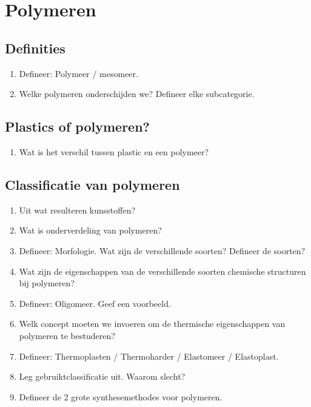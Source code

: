 \documentclass[a4paper,12pt]{article}
\begin{document}
    \maketitle

    \section{Polymeren}
    \subsection*{Definities}
    \begin{enumerate}
        \item Defineer: Polymeer / mesomeer.
        \item Welke polymeren onderschijden we? Defineer elke subcategorie.
    \end{enumerate}
    \subsection*{Plastics of polymeren?}
    \begin{enumerate}
        \item Wat is het verschil tussen plastic en een polymeer?
    \end{enumerate}
    \subsection*{Classificatie van polymeren}
    \begin{enumerate}
        \item Uit wat resulteren kunsstoffen?
        \item Wat is onderverdeling van polymeren?
        \item Defineer: Morfologie. Wat zijn de verschillende soorten? Defineer de soorten?
        \item Wat zijn de eigenschappen van de verschillende soorten chemische structuren bij polymeren?
        \item Defineer: Oligomeer. Geef een voorbeeld.
        \item Welk concept moeten we invoeren om de thermische eigenschappen van polymeren te bestuderen?
        \item Defineer: Thermoplasten / Thermoharder / Elastomeer / Elastoplast.
        \item Leg gebruiktclassificatie uit. Waarom slecht?
        \item Defineer de 2 grote synthesemethodes voor polymeren.
    \end{enumerate}
\end{document}
